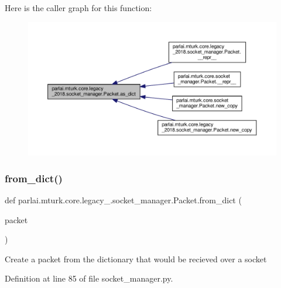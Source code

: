 Here is the caller graph for this function\+:
\nopagebreak
\begin{figure}[H]
\begin{center}
\leavevmode
\includegraphics[width=350pt]{classparlai_1_1mturk_1_1core_1_1legacy__2018_1_1socket__manager_1_1Packet_aa9cf63872aaa1f152fef9cdbe2069b17_icgraph}
\end{center}
\end{figure}
\mbox{\label{classparlai_1_1mturk_1_1core_1_1legacy__2018_1_1socket__manager_1_1Packet_a4ff11eed0eea4dcf2454533758f88a85}} 
\subsubsection{\texorpdfstring{from\+\_\+dict()}{from\_dict()}}
{\footnotesize\ttfamily def parlai.\+mturk.\+core.\+legacy\+\_.\+socket\+\_\+manager.\+Packet.\+from\+\_\+dict (\begin{DoxyParamCaption}\item[{}]{packet }\end{DoxyParamCaption})\hspace{0.3cm}{\ttfamily [static]}}

\begin{DoxyVerb}Create a packet from the dictionary that would
be recieved over a socket
\end{DoxyVerb}
 

Definition at line 85 of file socket\+\_\+manager.\+py.



